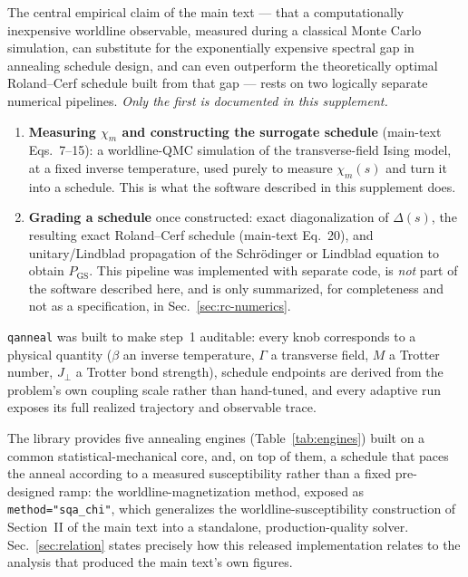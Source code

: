 \documentclass[11pt]{article}
\newcommand{\chim}{\chi_{m}}
\begin{document}
The central empirical claim of the main text --- that a computationally inexpensive worldline
observable, measured during a classical Monte Carlo simulation, can substitute for the
exponentially expensive spectral gap in annealing schedule design, and can even outperform the
theoretically optimal Roland--Cerf schedule built from that gap --- rests on two logically
separate numerical pipelines. \emph{Only the first is documented in this supplement.}

\begin{enumerate}
\item \textbf{Measuring $\chim$ and constructing the surrogate schedule} (main-text Eqs.~7--15):
a worldline-QMC simulation of the transverse-field Ising model, at a fixed inverse temperature,
used purely to measure $\chim(s)$ and turn it into a schedule. This is what the software described
in this supplement does.
\item \textbf{Grading a schedule} once constructed: exact diagonalization of $\Delta(s)$, the
resulting exact Roland--Cerf schedule (main-text Eq.~20), and unitary/Lindblad propagation of the
Schr\"odinger or Lindblad equation to obtain $P_{\mathrm{GS}}$. This pipeline was implemented with
separate code, is \emph{not} part of the software described here, and is only summarized, for
completeness and not as a specification, in Sec.~\ref{sec:rc-numerics}.
\end{enumerate}

\texttt{qanneal} was built to make step~1 auditable: every knob corresponds to a physical quantity
($\beta$ an inverse temperature, $\Gamma$ a transverse field, $M$ a Trotter number, $J_\perp$ a
Trotter bond strength), schedule endpoints are derived from the problem's own coupling scale rather
than hand-tuned, and every adaptive run exposes its full realized trajectory and observable trace.

The library provides five annealing engines (Table~\ref{tab:engines}) built on a common
statistical-mechanical core, and, on top of them, a schedule that paces the anneal according to
a measured susceptibility rather than a fixed pre-designed ramp: the worldline-magnetization
method, exposed as \texttt{method="sqa\_chi"}, which generalizes the worldline-susceptibility
construction of Section~II of the main text into a standalone, production-quality solver.
Sec.~\ref{sec:relation} states precisely how this released implementation relates to the analysis
that produced the main text's own figures.
\end{document}
